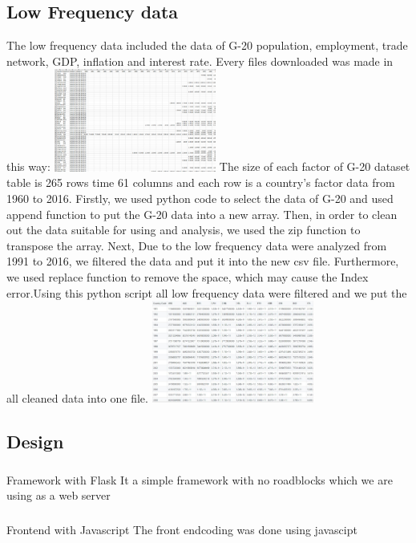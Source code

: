 \subsection{Low Frequency data}
The low frequency data included the data of G-20 population, employment, trade network, GDP, inflation and interest rate. Every files downloaded was made in this way: 
\newline
\includegraphics[width=0.40\textwidth]{all_data.png}
\newline
The size of each factor of G-20 dataset table is 265 rows time 61 columns and each row is a country's factor data  from 1960 to 2016.
Firstly, we used python code to select the data of G-20 and used append function to put the G-20 data into a new array.
Then,  in order to clean out the data suitable for using and analysis, we used the zip function to transpose the array.
Next, Due to the low frequency data were analyzed from 1991 to 2016, we filtered the data and put it into the new csv file.
Furthermore, we used replace function to remove the space, which may cause the Index error.Using this python script all low frequency data were filtered and we put the all cleaned data into one file.
\newline
\includegraphics[width=0.40\textwidth]{Capture.JPG}
\newline
\subsection{Design}
\subsubsection{}{Framework with Flask}
It a simple framework with no roadblocks which we are using as a web server
\subsubsection{}{Frontend with Javascript}
The front endcoding was done using javascipt
